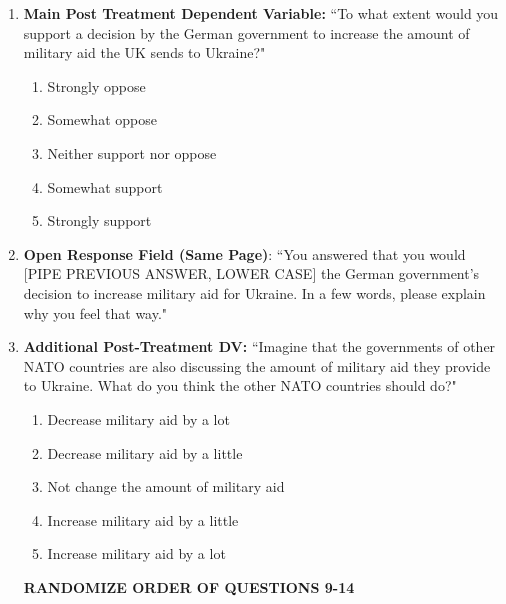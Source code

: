 \begin{appendices}
\begin{enumerate}
\begin{enumerate}
\paragraph{}
        Meanwhile, Donald Trump, in his second term as president of the United States, will also likely reassess how best to end the war. Imagine that President Trump announces plans to cut American military aid to Ukraine in order to end the fighting and create lasting peace and stability in Europe.
    \end{enumerate}
    \item \textbf{Main Post Treatment Dependent Variable:} ``To what extent would you support a decision by the German government to increase the amount of military aid the UK sends to Ukraine?" 
    \begin{enumerate}
            \item Strongly oppose
            \item Somewhat oppose
            \item Neither support nor oppose
            \item Somewhat support
            \item Strongly support
        \end{enumerate}
    \item \textbf{Open Response Field (Same Page)}: ``You answered that you would [PIPE PREVIOUS ANSWER, LOWER CASE] the German government's decision to increase military aid for Ukraine. In a few words, please explain why you feel that way."
    \item \textbf{Additional Post-Treatment DV:} ``Imagine that the governments of other NATO countries are also discussing the amount of military aid they provide to Ukraine. What do you think the other NATO countries should do?"
    \begin{enumerate}
        \item Decrease military aid by a lot
        \item Decrease military aid by a little
        \item  Not change the amount of military aid 
        \item Increase military aid by a little
        \item Increase military aid by a lot 
    \end{enumerate}
    
  \textbf{RANDOMIZE ORDER OF QUESTIONS 9-14}
  

\end{enumerate}
\end{appendices}
